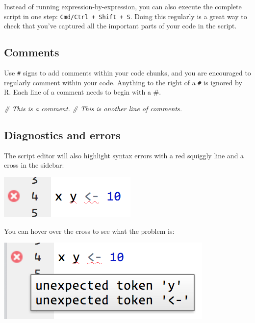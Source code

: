 \documentclass[]{book}
\newenvironment{Shaded}{\begin{snugshade}}{\end{snugshade}}
\newcommand{\CommentTok}[1]{\textcolor[rgb]{0.56,0.35,0.01}{\textit{#1}}}
\begin{document}
Instead of running expression-by-expression, you can also execute the complete script in one step: \texttt{Cmd/Ctrl\ +\ Shift\ +\ S}. Doing this regularly is a great way to check that you've captured all the important parts of your code in the script.

\hypertarget{comments}{%
\subsection{Comments}\label{comments}}

Use \texttt{\#} signs to add comments within your code chunks, and you are encouraged to regularly comment within your code. Anything to the right of a \texttt{\#} is ignored by R. Each line of a comment needs to begin with a \#.

\begin{Shaded}
\begin{Highlighting}[]
\CommentTok{# This is a comment.}
\CommentTok{# This is another line of comments.}
\end{Highlighting}
\end{Shaded}

\hypertarget{diagnostics-and-errors}{%
\subsection{Diagnostics and errors}\label{diagnostics-and-errors}}

The script editor will also highlight syntax errors with a red squiggly line and a cross in the sidebar:

\begin{center}\includegraphics[width=0.7\linewidth]{img/rstudio-diagnostic} \end{center}

You can hover over the cross to see what the problem is:

\begin{center}\includegraphics[width=0.7\linewidth]{img/rstudio-diagnostic-tip} \end{center}
\end{document}
